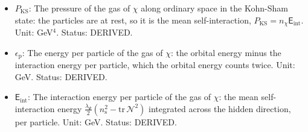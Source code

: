 \documentclass[
  10pt,
]{article}
\begin{document}
\begin{itemize}
  \(w_\chi = P_{\mathrm{KS}}/(n_\chi\epsilon_{\mathrm{p}})\) (0 for cold
  dark matter, \(-1\) for a vacuum energy). Unit: dimensionless. Status:
  DERIVED.
\item
  \(P_{\mathrm{KS}}\): The pressure of the gas of \(\chi\) along
  ordinary space in the Kohn-Sham state: the particles are at rest, so
  it is the mean self-interaction,
  \(P_{\mathrm{KS}} = n_\chi\mathsf{E}_{\mathrm{int}}\). Unit:
  GeV\(^4\). Status: DERIVED.
\item
  \(\epsilon_{\mathrm{p}}\): The energy per particle of the gas of
  \(\chi\): the orbital energy minus the interaction energy per
  particle, which the orbital energy counts twice. Unit: GeV. Status:
  DERIVED.
\item
  \(\mathsf{E}_{\mathrm{int}}\): The interaction energy per particle of
  the gas of \(\chi\): the mean self-interaction energy
  \(\frac{\lambda_\Psi}{2}(n_{\mathrm{s}}^2 - \mathrm{tr}\,\mathcal{N}^2)\)
  integrated across the hidden direction, per particle. Unit: GeV.
  Status: DERIVED.
\end{itemize}
\end{document}
